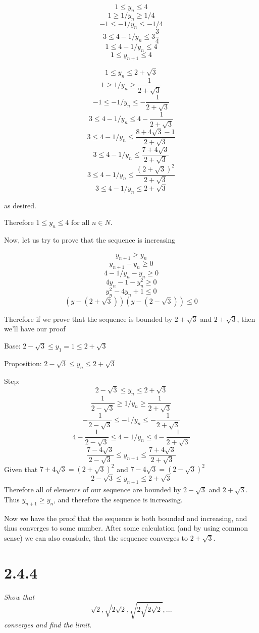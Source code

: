 \documentclass[11pt,oneside,titlepage]{article}
\begin{document}
$$1 \leq y_n \leq 4$$
$$1 \geq 1/y_n \geq 1/4$$
$$-1 \leq -1/y_n \leq -1/4$$
$$3 \leq 4 - 1/y_n \leq 3 \frac{3}{4}$$
$$1 \leq 4 - 1/y_n \leq 4$$
$$1 \leq y_{n + 1} \leq 4$$


$$1 \leq y_n \leq 2 + \sqrt{3}$$
$$1 \geq 1/y_n \geq \frac{1}{2 + \sqrt{3}}$$
$$-1 \leq -1/y_n \leq -\frac{1}{2 + \sqrt{3}}$$
$$3 \leq 4 - 1/y_n \leq 4  -\frac{1}{2 + \sqrt{3}}$$
$$3 \leq 4 - 1/y_n \leq \frac{8 + 4 \sqrt{3} - 1}{2 + \sqrt{3}}$$
$$3 \leq 4 - 1/y_n \leq \frac{7 + 4 \sqrt{3}}{2 + \sqrt{3}}$$
$$3 \leq 4 - 1/y_n \leq \frac{(2 + \sqrt{3})^2}{2 + \sqrt{3}}$$
$$3 \leq 4 - 1/y_n \leq 2 + \sqrt{3}$$

as desired.

Therefore $1 \leq y_n \leq 4$ for all $n \in N$.

Now, let us try to prove that the sequence is increasing

$$y_{n + 1} \geq y_n $$
$$y_{n + 1} - y_n \geq 0 $$
$$4 - 1/y_n - y_n \geq 0 $$
$$4y_n - 1 - y_n^2 \geq 0 $$
$$y_n^2 - 4 y_n + 1 \leq 0 $$
$$(y - (2 + \sqrt{3}))(y - (2 - \sqrt{3})) \leq 0 $$

Therefore  if we prove that the sequence is bounded by $2 + \sqrt{3}$ and
$2 + \sqrt{3}$, then we'll have our proof

Base: $2 - \sqrt{3} \leq y_1 = 1 \leq 2 + \sqrt{3}$

Proposition: $2 - \sqrt{3} \leq y_n \leq 2 + \sqrt{3}$

Step:
$$2 - \sqrt{3} \leq y_n \leq 2 + \sqrt{3}$$
$$\frac{1}{2 - \sqrt{3}} \geq 1/y_n \geq \frac{1}{2 + \sqrt{3}}$$
$$-\frac{1}{2 - \sqrt{3}} \leq -1/y_n \leq - \frac{1}{2 + \sqrt{3}}$$
$$4 -\frac{1}{2 - \sqrt{3}} \leq 4  -1/y_n \leq 4 - \frac{1}{2 + \sqrt{3}}$$
$$\frac{7 - 4 \sqrt{3}}{2 - \sqrt{3}} \leq y_{n + 1} \leq \frac{7 + 4 \sqrt{3}}{2 + \sqrt{3}}$$
Given that $7 + 4 \sqrt{3} = (2 + \sqrt{3})^2$ and $7 - 4 \sqrt{3} = (2 - \sqrt{3})^2$ 
$$2 - \sqrt{3} \leq y_{n + 1} \leq 2 + \sqrt{3}$$
Therefore all of elements of our sequence are bounded by $2 - \sqrt{3}$ and
$2 + \sqrt{3}$. Thus $y_{n + 1} \geq y_n$, and therefore the sequence is increasing.

Now we have the proof that the sequence is both bounded and increasing, and thus
converges to some number. After some calculation (and by using common sense) we can
also conslude, that the sequence converges to $2 + \sqrt{3}$.

\section*{2.4.4}
\textit{Show that }
$$ \sqrt{2}, \sqrt{2 \sqrt{2}}, \sqrt{ 2 \sqrt{ 2 \sqrt{2}}}, ... $$
\textit{converges and find the limit.}
\end{document}

